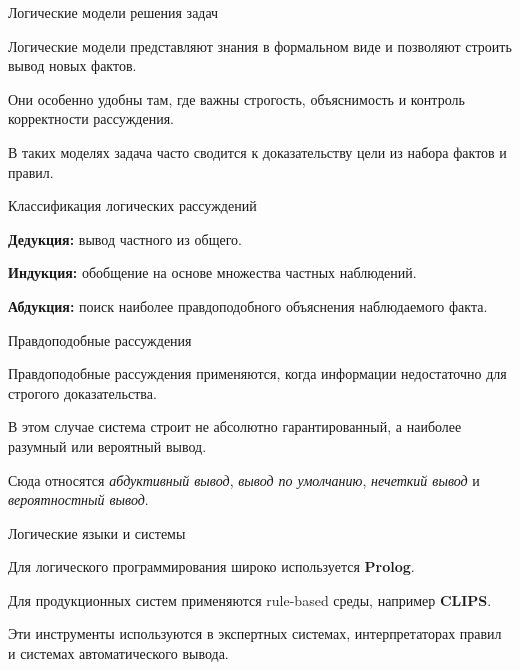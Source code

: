 \begin{frame}{Логические модели решения задач}
	\topline
	\justifying
	
	\begin{textitemize}
		\item Логические модели представляют знания в формальном виде и позволяют строить вывод новых фактов.
		\item Они особенно удобны там, где важны строгость, объяснимость и контроль корректности рассуждения.
		\item В таких моделях задача часто сводится к доказательству цели из набора фактов и правил.
	\end{textitemize}
\end{frame}

\begin{frame}{Классификация логических рассуждений}
	\topline
	\justifying
	
	\begin{textitemize}
		\item \textbf{Дедукция:} вывод частного из общего.
		\item \textbf{Индукция:} обобщение на основе множества частных наблюдений.
		\item \textbf{Абдукция:} поиск наиболее правдоподобного объяснения наблюдаемого факта.
	\end{textitemize}
\end{frame}

\begin{frame}{Правдоподобные рассуждения}
	\topline
	\justifying
	
	\begin{textitemize}
		\item Правдоподобные рассуждения применяются, когда информации недостаточно для строгого доказательства.
		\item В этом случае система строит не абсолютно гарантированный, а наиболее разумный или вероятный вывод.
		\item Сюда относятся \textit{абдуктивный вывод}, \textit{вывод по умолчанию}, \textit{нечеткий вывод} и \textit{вероятностный вывод}.
	\end{textitemize}
\end{frame}

\begin{frame}{Логические языки и системы}
	\topline
	\justifying
	
	\begin{textitemize}
		\item Для логического программирования широко используется \textbf{Prolog}.
		\item Для продукционных систем применяются rule-based среды, например \textbf{CLIPS}.
		\item Эти инструменты используются в экспертных системах, интерпретаторах правил и системах автоматического вывода.
	\end{textitemize}
\end{frame}

